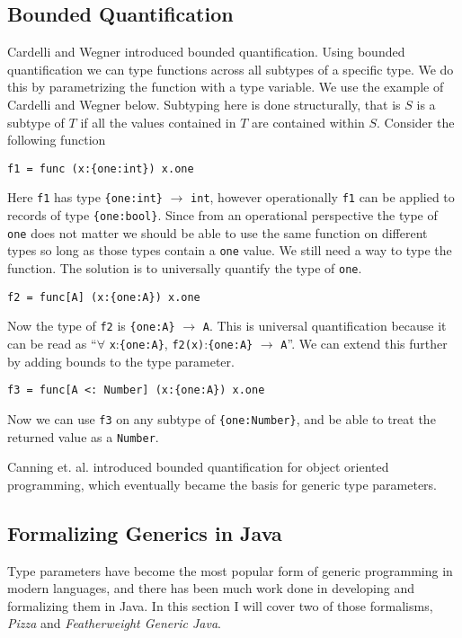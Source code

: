 \documentclass[11pt
              , a4paper
              , twoside
              , openright
              ]{report}
\numberwithin{case}{theorem}
\numberwithin{subcase}{case}
\begin{document}
\subsection{Bounded Quantification}
Cardelli and Wegner \cite{Cardelli:1985:UTD:6041.6042} introduced bounded quantification. Using bounded quantification we can type functions across all subtypes of a specific type. We do this by parametrizing the function with a type variable. We use the example of Cardelli and Wegner below. Subtyping here is done structurally, that is $S$ is a subtype of $T$ if all the values contained in $T$ are contained within $S$. Consider the following function
\begin{lstlisting}[mathescape, style=custom_lang]
f1 = func (x:{one:int}) x.one
\end{lstlisting}
Here \verb|f1| has type \verb|{one:int}| $\rightarrow$ \verb|int|, however operationally \verb|f1| can be applied to records of type \verb|{one:bool}|. Since from an operational perspective the type of \verb|one| does not matter we should be able to use the same function on different types so long as those types contain a \verb|one| value. We still need a way to type the function. The solution is to universally quantify the type of \verb|one|.
\begin{lstlisting}[mathescape, style=custom_lang]
f2 = func[A] (x:{one:A}) x.one
\end{lstlisting}
Now the type of \verb|f2| is \verb|{one:A}| $\rightarrow$ \verb|A|. This is universal quantification because it can be read as ``$\forall$ \verb|x|:\verb|{one:A}|, \verb|f2(x)|:\verb|{one:A}| $\rightarrow$ \verb|A|''. We can extend this further by adding bounds to the type parameter.
\begin{lstlisting}[mathescape, style=custom_lang]
f3 = func[A <: Number] (x:{one:A}) x.one
\end{lstlisting}
Now we can use \verb|f3| on any subtype of \verb|{one:Number}|, and be able to treat the returned value as a \verb|Number|.

Canning et. al. \cite{Canning:1989:FPO:99370.99392} introduced bounded quantification for object oriented programming, which eventually became the basis for generic type parameters.

\subsection{Formalizing Generics in Java}
Type parameters have become the most popular form of generic programming in modern languages, and there has been much work done in developing and formalizing them \cite{agesen1997adding,Igarashi:2001:FJM:503502.503505,Odersky:1997:PJT:263699.263715, Bank:1997:PTJ:263699.263714, Bracha:1998:MFS:286936.286957,Cartwright:1998:CGR:286936.286958} in Java. In this section I will cover two of those formalisms, \emph{Pizza} and \emph{Featherweight Generic Java}.
\end{document}

